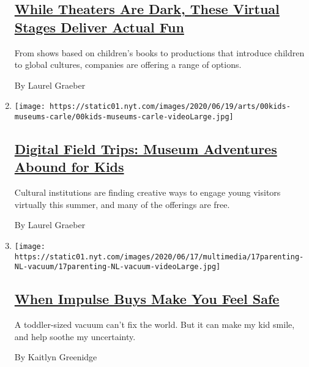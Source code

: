 \begin{enumerate}
  \hypertarget{while-theaters-are-dark-these-virtual-stages-deliver-actual-fun}{%
  \subsection{\texorpdfstring{\href{/2020/06/18/theater/kids-summer-theater-virtual.html}{While
  Theaters Are Dark, These Virtual Stages Deliver Actual
  Fun}}{While Theaters Are Dark, These Virtual Stages Deliver Actual Fun}}\label{while-theaters-are-dark-these-virtual-stages-deliver-actual-fun}}

  From shows based on children's books to productions that introduce
  children to global cultures, companies are offering a range of
  options.

  By Laurel Graeber
\item
  \texttt{[image: https://static01.nyt.com/images/2020/06/19/arts/00kids-museums-carle/00kids-museums-carle-videoLarge.jpg]}

  \hypertarget{digital-field-trips-museum-adventures-abound-for-kids}{%
  \subsection{\texorpdfstring{\href{/2020/06/18/arts/design/kids-museums-summer-virus.html}{Digital
  Field Trips: Museum Adventures Abound for
  Kids}}{Digital Field Trips: Museum Adventures Abound for Kids}}\label{digital-field-trips-museum-adventures-abound-for-kids}}

  Cultural institutions are finding creative ways to engage young
  visitors virtually this summer, and many of the offerings are free.

  By Laurel Graeber
\item
  \texttt{[image: https://static01.nyt.com/images/2020/06/17/multimedia/17parenting-NL-vacuum/17parenting-NL-vacuum-videoLarge.jpg]}

  \hypertarget{when-impulse-buys-make-you-feel-safe}{%
  \subsection{\texorpdfstring{\href{/2020/06/17/parenting/virus-impulse-buys.html}{When
  Impulse Buys Make You Feel
  Safe}}{When Impulse Buys Make You Feel Safe}}\label{when-impulse-buys-make-you-feel-safe}}

  A toddler-sized vacuum can't fix the world. But it can make my kid
  smile, and help soothe my uncertainty.

  By Kaitlyn Greenidge
\end{enumerate}

